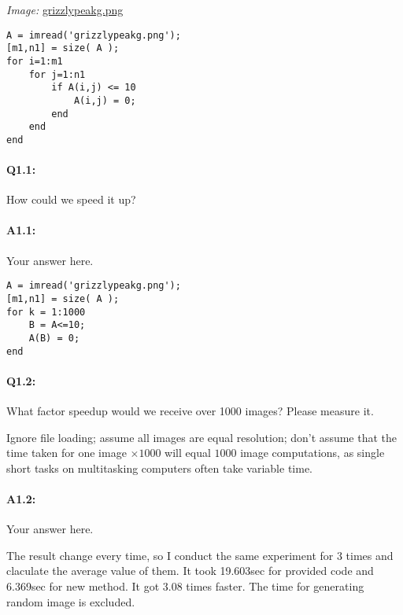 \documentclass[11pt]{article}
\begin{document}
\emph{Image:} \href{grizzlypeakg.png}{grizzlypeakg.png}

\begin{lstlisting}[style=Matlab-editor]
A = imread('grizzlypeakg.png');
[m1,n1] = size( A );
for i=1:m1
    for j=1:n1
        if A(i,j) <= 10
            A(i,j) = 0;
        end
    end
end
\end{lstlisting}

\paragraph{Q1.1:} How could we speed it up?

\paragraph{A1.1:} Your answer here.


\begin{lstlisting}[style=Matlab-editor]
A = imread('grizzlypeakg.png');
[m1,n1] = size( A );
for k = 1:1000
	B = A<=10;
	A(B) = 0;
end
\end{lstlisting}




\pagebreak
\paragraph{Q1.2:} What factor speedup would we receive over 1000 images? Please measure it.

Ignore file loading; assume all images are equal resolution; don't assume that the time taken for one image $\times1000$ will equal $1000$ image computations, as single short tasks on multitasking computers often take variable time.

\paragraph{A1.2:} Your answer here.

The result change every time, so I conduct the same experiment for 3 times and claculate the average value of them. It took 19.603sec for provided code and 6.369sec for new method. It got 3.08 times faster. 
The time for generating random image is excluded. 


\pagebreak
\end{document}
